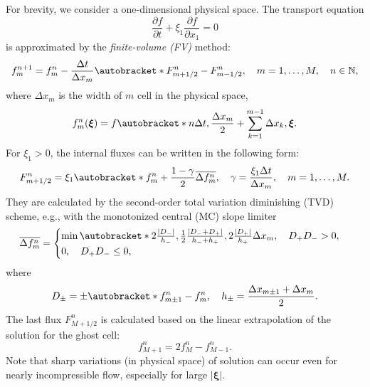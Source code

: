 \documentclass[]{elsarticle} %
\newcommand{\pder}[2][]{\frac{\partial#1}{\partial#2}}
\DeclarePairedDelimiter\autobracket()       %
\newcommand{\br}[1]{\autobracket*{#1}}
\newcommand{\bxi}{\boldsymbol{\xi}}
\begin{document}
{For brevity, we consider a one-dimensional physical space.
The transport equation
\begin{equation}\label{eq:transport}
    \pder[f]{t} + \xi_1\pder[f]{x_1} = 0
\end{equation}
is approximated by the \emph{finite-volume (FV)} method:
\begin{equation}\label{eq:finite_volume}
    f^{n+1}_m = f^n_m - \frac{\Delta{t}}{\Delta{x_m}}\br{F^n_{m+1/2}-F^n_{m-1/2}}, \quad
    m = 1,\dots,M, \quad n\in\mathbb{N},
\end{equation}
where \(\Delta{x_m}\) is the width of \(m\) cell in the physical space,
\begin{equation}\label{eq:vdf_fv}
    f^n_m(\bxi) = f\br{n\Delta{t}, \frac{\Delta{x_m}}2 + \sum_{k=1}^{m-1}\Delta{x_k}, \bxi}.
\end{equation}
For \(\xi_1>0\), the internal fluxes can be written in the following form:
\begin{equation}\label{eq:internal_fluxes}
    F_{m+1/2}^n = \xi_1\br{ f_m^n + \frac{1-\gamma}2\overline{\Delta{f_m^n}}},
    \quad \gamma = \frac{\xi_1\Delta{t}}{\Delta{x_m}}, \quad m = 1,\dots,M.
\end{equation}
They are calculated by the second-order total variation diminishing (TVD) scheme,
e.g., with the monotonized central (MC) slope limiter
\begin{equation}\label{eq:limiter}
    \overline{\Delta{f_m^n}} = \begin{cases}\min\br{
         2\frac{|D_-|}{h_-}, \frac12\frac{|D_-+D_+|}{h_-+h_+}, 2\frac{|D_+|}{h_+}
    }\Delta{x_m}, \quad D_+D_- > 0, \\
    0, \quad D_+D_- \leq 0,
    \end{cases}
\end{equation}
where
\begin{equation}\label{eq:differences}
    D_\pm = \pm\br{f_{m\pm1}^n - f_m^n}, \quad h_\pm = \frac{\Delta{x_{m\pm1}} + \Delta{x_m}}2.
\end{equation}
The last flux \(F_{M+1/2}^n\) is calculated based on the linear extrapolation of the solution for the ghost cell:
\begin{equation}\label{eq:last_ghost}
    f_{M+1}^n = 2f_M^n - f_{M-1}^n.
\end{equation}
Note that sharp variations (in physical space) of solution can occur even for nearly incompressible flow,
especially for large \(|\bxi|\).

}
\end{document}
